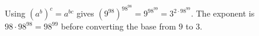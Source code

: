 Using $(a^b)^c=a^{bc}$ gives $(9^{98})^{98^{98}}=9^{98^{99}}=\boxed{3^{2\cdot98^{99}}}$. The exponent is $98\cdot98^{98}=98^{99}$ before converting the base from $9$ to $3$.
